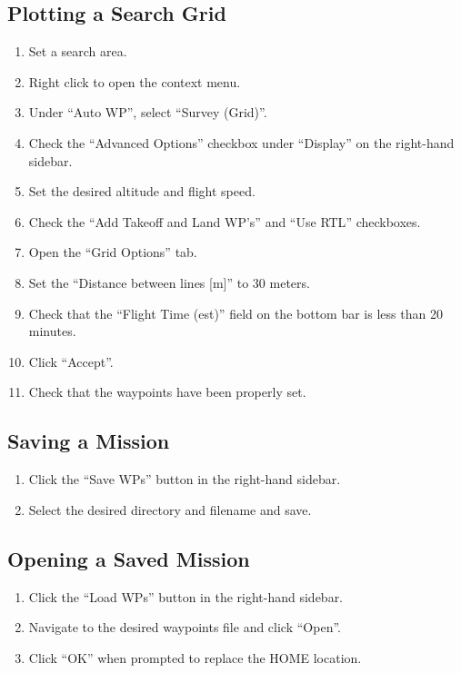 \documentclass{report}
\begin{document}
		\subsection{Plotting a Search Grid}
			\begin{enumerate}
				\item Set a search area.
				\item Right click to open the context menu.
				\item Under ``Auto WP'', select ``Survey (Grid)''.
				\item Check the ``Advanced Options'' checkbox under ``Display'' on the right-hand sidebar.
				\item Set the desired altitude and flight speed.
				\item Check the ``Add Takeoff and Land WP's'' and ``Use \gls{RTL}'' checkboxes.
				\item Open the ``Grid Options'' tab.
				\item Set the ``Distance between lines [m]'' to 30 meters.
				\item Check that the ``Flight Time (est)'' field on the bottom bar is less than 20 minutes.
				\item Click ``Accept''.
				\item Check that the waypoints have been properly set.
			\end{enumerate}
		\subsection{Saving a Mission}
			\begin{enumerate}
				\item Click the ``Save WPs'' button in the right-hand sidebar.
				\item Select the desired directory and filename and save.
			\end{enumerate}
		\subsection{Opening a Saved Mission}
			\begin{enumerate}
				\item Click the ``Load WPs'' button in the right-hand sidebar.
				\item Navigate to the desired waypoints file and click ``Open''.
				\item Click ``OK'' when prompted to replace the HOME location.
			\end{enumerate}
\end{document}
